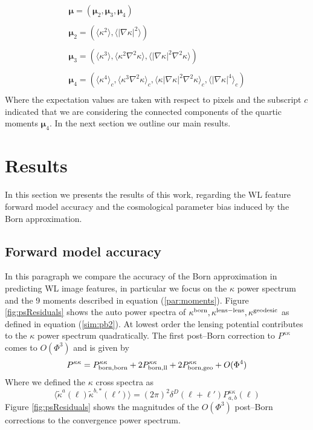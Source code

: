 \documentclass[reprint,aps,prd,superscriptaddress,showkeys,showpacs]{revtex4-1}
\begin{document}
\begin{equation}
\label{par:moments}
\begin{matrix}
\pmb{\mu} = (\pmb{\mu}_2,\pmb{\mu}_3,\pmb{\mu}_4) \\ \\
\pmb{\mu}_2 = \left(\langle\kappa^2\rangle,\langle\vert\nabla\kappa\vert^2\rangle\right) \\ \\
\pmb{\mu}_3 = \left(\langle\kappa^3\rangle,\langle\kappa^2\nabla^2\kappa\rangle,\langle\vert\nabla\kappa\vert^2\nabla^2\kappa\rangle\right) \\ \\
\pmb{\mu}_4 = \left(\langle\kappa^4\rangle_c,\langle\kappa^3\nabla^2\kappa\rangle_c,\langle\kappa\vert\nabla\kappa\vert^2\nabla^2\kappa\rangle_c,\langle\vert\nabla\kappa\vert^4\rangle_c\right) \\
\end{matrix}
\end{equation} 
%
Where the expectation values are taken with respect to pixels and the subscript $c$ indicated that we are considering the connected components of the quartic moments $\pmb{\mu}_4$. In the next section we outline our main results.  


\section{Results}
% 
In this section we presents the results of this work, regarding the WL feature forward model accuracy and the cosmological parameter bias induced by the Born approximation. 

\subsection{Forward model accuracy}

In this paragraph we compare the accuracy of the Born approximation in predicting WL image features, in particular we focus on the $\kappa$ power spectrum and the 9 moments described in equation (\ref{par:moments}). Figure \ref{fig:psResiduals} shows the auto power spectra of $\kappa^{\rm born},\kappa^{\rm lens-lens},\kappa^{\rm geodesic}$ as defined in equation (\ref{sim:pb2}). At lowest order the lensing potential contributes to the $\kappa$ power spectrum quadratically. The first post--Born correction to $P^{\kappa\kappa}$ comes to $O(\Phi^3)$ and is given by
\begin{equation}
\label{res:powercorr}
P^{\kappa\kappa} = P^{\kappa\kappa}_{\rm born,born} + 2P^{\kappa\kappa}_{\rm born,ll} + 2P^{\kappa\kappa}_{\rm born,geo} + O(\Phi^4)
\end{equation}
%
Where we defined the $\kappa$ cross spectra as
\begin{equation}
\label{res:powercross}
\langle\tilde{\kappa}^{a}(\pmb{\ell})\tilde{\kappa}^{b,*}(\pmb{\ell}')\rangle = (2\pi)^2\delta^D(\pmb{\ell}+\pmb{\ell}')P_{a,b}^{\kappa\kappa}(\ell)
\end{equation} 
%
Figure \ref{fig:psResiduals} shows the magnitudes of the $O(\Phi^3)$ post--Born corrections to the convergence power spectrum. 
\end{document}
